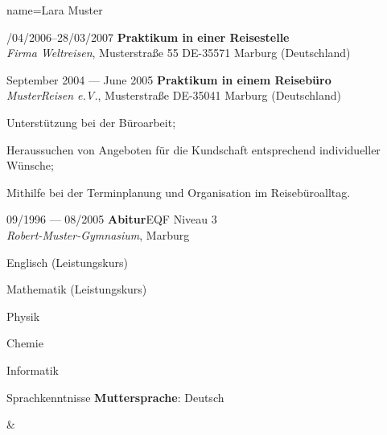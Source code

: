 \documentclass[a4paper, 12pt]{classycv}
\begin{document}
\begin{Resume}{%
	name=Lara Muster%
}
\begin{Entry}{%
    \color{accent-color}/04/2006–28/03/2007%
}{%
    \textbf{Praktikum in einer Reisestelle}\\\textit{Firma Weltreisen}, Musterstraße 55 DE-35571 Marburg (Deutschland)%
}
\end{Entry}
%
\begin{Entry}{%
    \color{accent-color}\selectfont September 2004 --- June 2005%
}{%
    \textbf{Praktikum in einem Reisebüro}\\\textit{MusterReisen e.V.}, Musterstraße DE-35041 Marburg (Deutschland)%
}%
    \begin{List}[skip above=0pt]%
        \item Unterstützung bei der Büroarbeit;
        \item Heraussuchen von Angeboten für die Kundschaft entsprechend individueller Wünsche;
        \item Mithilfe bei der Terminplanung und Organisation im Reisebüroalltag.
    \end{List}
\end{Entry}
\newpage
{}%
%
\begin{Entry}{09/1996 --- 08/2005}{%
    \textbf{Abitur}\hfill EQF Niveau 3\\\textit{Robert-Muster-Gymnasium}, Marburg%
}%
    \begin{List}[skip above=0pt]%
        \item Englisch (Leistungskurs)
        \item Mathematik (Leistungskurs)
        \item Physik
        \item Chemie
        \item Informatik
    \end{List}
\end{Entry}
% 
%
%
\begin{Entry}{Sprachkenntnisse}{}%
    \textbf{Muttersprache}: Deutsch%
    \begin{Table}[column format={%
        C{0.15\linewidth-2\tabcolsep-\arrayrulewidth}%
        *{2}{C{0.15\linewidth-2\tabcolsep-\arrayrulewidth}}%
        *{2}{C{0.15\linewidth-2\tabcolsep-\arrayrulewidth}}%
        C{0.25\linewidth-2\tabcolsep-\arrayrulewidth}}%
        , stretch=1.5%
        , basic style={\lmrfamily\small\color{dark-gray}}]
            & %

\end{Table}
\end{Entry}
\end{Resume}
\end{document}
